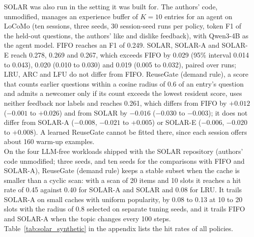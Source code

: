 SOLAR was also run in the setting it was built for. The authors' code, unmodified, manages an experience buffer of $K=10$ entries for an agent on LoCoMo (ten sessions, three seeds, 30 session-seed runs per policy, token F1 of the held-out questions, the authors' like and dislike feedback), with Qwen3-4B as the agent model. FIFO reaches an F1 of 0.249. SOLAR, SOLAR-A and SOLAR-E reach 0.278, 0.269 and 0.267, which exceeds FIFO by 0.029 (95\% interval 0.014 to 0.043), 0.020 (0.010 to 0.030) and 0.019 (0.005 to 0.032), paired over runs; LRU, ARC and LFU do not differ from FIFO. ReuseGate (demand rule), a score that counts earlier questions within a cosine radius of 0.6 of an entry's question and admits a newcomer only if its count exceeds the lowest resident score, uses neither feedback nor labels and reaches 0.261, which differs from FIFO by $+0.012$ ($-0.001$ to $+0.026$) and from SOLAR by $-0.016$ ($-0.030$ to $-0.003$); it does not differ from SOLAR-A ($-0.008$, $-0.021$ to $+0.005$) or SOLAR-E ($-0.006$, $-0.020$ to $+0.008$). A learned ReuseGate cannot be fitted there, since each session offers about 160 warm-up examples.
\\
On the four LLM-free workloads shipped with the SOLAR repository (authors' code unmodified; three seeds, and ten seeds for the comparisons with FIFO and SOLAR-A), ReuseGate (demand rule) keeps a stable subset when the cache is smaller than a cyclic scan: with a scan of 20 items and 10 slots it reaches a hit rate of 0.45 against 0.40 for SOLAR-A and SOLAR and 0.08 for LRU. It trails SOLAR-A on small caches with uniform popularity, by 0.08 to 0.13 at 10 to 20 slots with the radius of 0.8 selected on separate tuning seeds, and it trails FIFO and SOLAR-A when the topic changes every 100 steps. Table~\ref{tab:solar_synthetic} in the appendix lists the hit rates of all policies.
